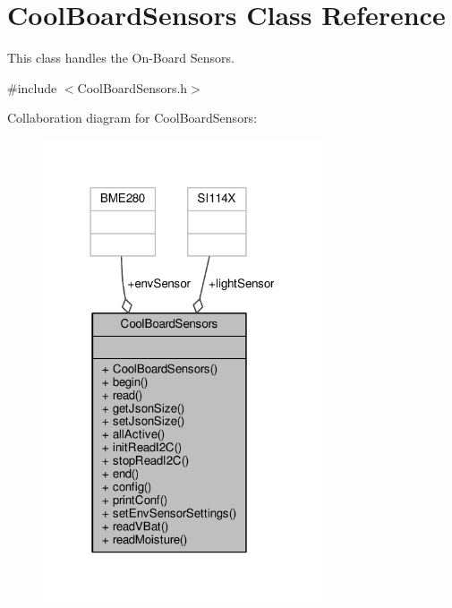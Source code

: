 \hypertarget{class_cool_board_sensors}{}\section{Cool\+Board\+Sensors Class Reference}
\label{class_cool_board_sensors}


This class handles the On-\/\+Board Sensors.  




{\ttfamily \#include $<$Cool\+Board\+Sensors.\+h$>$}



Collaboration diagram for Cool\+Board\+Sensors\+:\nopagebreak
\begin{figure}[H]
\begin{center}
\leavevmode
\includegraphics[width=234pt]{class_cool_board_sensors__coll__graph}
\end{center}
\end{figure}
